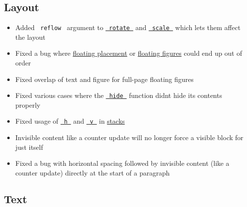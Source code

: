 \subsection{Layout}\label{layout}

\begin{itemize}
\tightlist
\item
  Added \texttt{\ reflow\ } argument to
  \href{/docs/reference/layout/rotate/}{\texttt{\ rotate\ }} and
  \href{/docs/reference/layout/scale/}{\texttt{\ scale\ }} which lets
  them affect the layout
\item
  Fixed a bug where
  \href{/docs/reference/layout/place/\#parameters-float}{floating
  placement} or
  \href{/docs/reference/model/figure/\#parameters-placement}{floating
  figures} could end up out of order
\item
  Fixed overlap of text and figure for full-page floating figures
\item
  Fixed various cases where the
  \href{/docs/reference/layout/hide/}{\texttt{\ hide\ }} function
  didn\textquotesingle t hide its contents properly
\item
  Fixed usage of \href{/docs/reference/layout/h/}{\texttt{\ h\ }} and
  \href{/docs/reference/layout/v/}{\texttt{\ v\ }} in
  \href{/docs/reference/layout/stack/}{stacks}
\item
  Invisible content like a counter update will no longer force a visible
  block for just itself
\item
  Fixed a bug with horizontal spacing followed by invisible content
  (like a counter update) directly at the start of a paragraph
\end{itemize}

\subsection{Text}\label{text}

